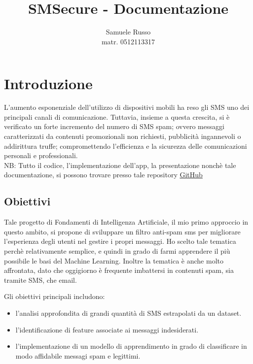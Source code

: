 \documentclass[]{article}
\title{SMSecure - Documentazione}
\author{Samuele Russo\\matr.  0512113317}
\date{} %
\begin{document}
\maketitle

\newpage

\tableofcontents

\newpage

\section{Introduzione}

    L'aumento esponenziale dell'utilizzo di dispositivi mobili ha reso gli SMS uno dei principali canali di comunicazione. Tuttavia, insieme a questa crescita, si è verificato un forte incremento del numero di SMS spam; ovvero messaggi caratterizzati da contenuti promozionali non richiesti, pubblicità ingannevoli o addirittura truffe; compromettendo l'efficienza e la sicurezza delle comunicazioni personali e professionali.\\
    NB: Tutto il codice,  l'implementazione dell'app, la presentazione nonchè tale documentazione, si possono trovare presso tale repository \href{https://github.com/russosamuele/SMSecure.git}{GitHub}


    \subsection{Obiettivi}

        Tale progetto di Fondamenti di Intelligenza Artificiale, il mio primo approccio in questo ambito, si propone di sviluppare un filtro anti-spam sms per migliorare l'esperienza degli utenti nel gestire i propri messaggi. Ho scelto tale tematica perchè relativamente semplice, e quindi in grado di farmi apprendere il più possibile le basi del Machine Learning. Inoltre la tematica è anche molto affrontata, dato che oggigiorno è frequente imbattersi in contenuti spam, sia tramite SMS, che email.

        Gli obiettivi principali includono:
        \begin{itemize}
            \item l'analisi approfondita di grandi quantità di SMS        estrapolati da un dataset.
            \item l'identificazione di feature associate ai               messaggi indesiderati.
            \item l'implementazione di un modello di apprendimento in grado di classificare in modo affidabile messagi spam e legittimi.
        \end{itemize}
\end{document}
